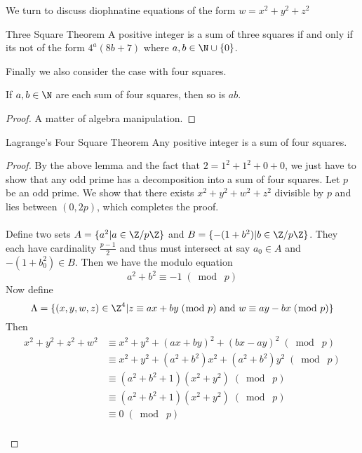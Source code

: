 \documentclass[a4paper]{article}
\begin{document}
We turn to discuss diophnatine equations of the form $w=x^2+y^2+z^2$

\begin{thm}{Three Square Theorem}{} A positive integer is a sum of three squares if and only if its not of the form $4^a(8b+7)$ where $a,b\in\N\cup\{0\}$. 
\end{thm}

Finally we also consider the case with four squares. 

\begin{lmm}{}{} If $a,b\in\N$ are each sum of four squares, then so is $ab$. \tcbline
\begin{proof}
A matter of algebra manipulation. 
\end{proof}
\end{lmm}

\begin{thm}{Lagrange's Four Square Theorem}{} Any positive integer is a sum of four squares. \tcbline
\begin{proof}
By the above lemma and the fact that $2=1^2+1^2+0+0$, we just have to show that any odd prime has a decomposition into a sum of four squares. Let $p$ be an odd prime. We show that there exists $x^2+y^2+w^2+z^2$ divisible by $p$ and lies between $(0,2p)$, which completes the proof. \\~\\
Define two sets $A=\{a^2|a\in\Z/p\Z\}$ and $B=\{-(1+b^2)|b\in\Z/p\Z\}$. They each have cardinality $\frac{p-1}{2}$ and thus must intersect at say $a_0\in A$ and $-(1+b_0^2)\in B$. Then we have the modulo equation $$a^2+b^2\equiv-1\;(\bmod\;p)$$ Now define $$\Lambda=\{(x,y,w,z)\in\Z^4|z\equiv ax+by\;(\bmod\;p)\text{ and }w\equiv ay-bx\;(\bmod\;p)\}$$ Then 
\begin{align*}
x^2+y^2+z^2+w^2&\equiv x^2+y^2+(ax+by)^2+(bx-ay)^2\;(\bmod\;p)\\
&\equiv x^2+y^2+(a^2+b^2)x^2+(a^2+b^2)y^2\;(\bmod\;p)\\
&\equiv(a^2+b^2+1)(x^2+y^2)\;(\bmod\;p)\\
&\equiv(a^2+b^2+1)(x^2+y^2)\;(\bmod\;p)\\
&\equiv 0\;(\bmod\;p)
\end{align*}~\\

\end{proof}
\end{thm}
\end{document}
